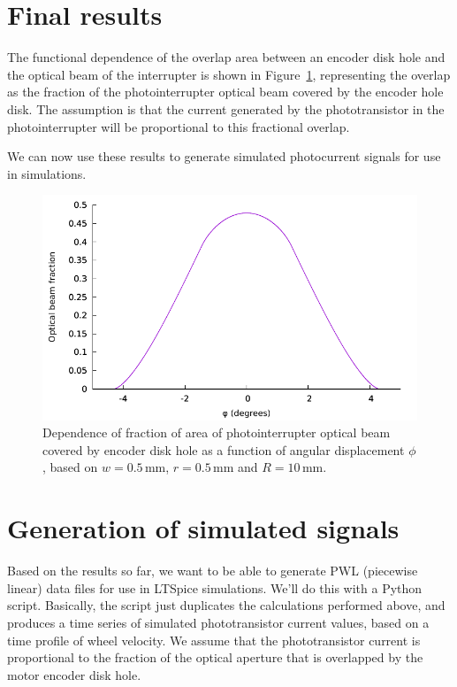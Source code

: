 \documentclass[a4paper,11pt,article]{memoir}
\begin{document}
\section*{Final results}

The functional dependence of the overlap area between an encoder disk
hole and the optical beam of the interrupter is shown in
Figure~\ref{fig:overlap-areas}, representing the overlap as the
fraction of the photointerrupter optical beam covered by the encoder
hole disk. The assumption is that the current generated by the
phototransistor in the photointerrupter will be proportional to this
fractional overlap.

We can now use these results to generate simulated photocurrent
signals for use in simulations.

\begin{figure}
  \begin{center}
    \includegraphics[width=\textwidth]{overlap-areas}
  \end{center}

  \caption{Dependence of fraction of area of photointerrupter optical
    beam covered by encoder disk hole as a function of angular
    displacement $\phi$, based on $w = 0.5\,\mathrm{mm}$, $r =
    0.5\,\mathrm{mm}$ and $R = 10\,\mathrm{mm}$.}\label{fig:overlap-areas}
\end{figure}

\section*{Generation of simulated signals}

Based on the results so far, we want to be able to generate PWL
(piecewise linear) data files for use in LTSpice simulations. We'll do
this with a Python script. Basically, the script just duplicates the
calculations performed above, and produces a time series of simulated
phototransistor current values, based on a time profile of wheel
velocity. We assume that the phototransistor current is proportional
to the fraction of the optical aperture that is overlapped by the
motor encoder disk hole.
\end{document}
